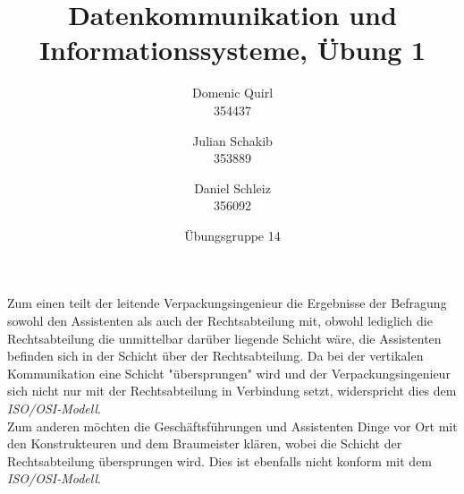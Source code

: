 \documentclass{../exercisesheet}
\title{Datenkommunikation und Informationssysteme, Übung 1}
\author{
    Domenic Quirl \\ 354437
    \and
    Julian Schakib \\ 353889
    \and 
    Daniel Schleiz \\ 356092
}
\date{Übungsgruppe 14}
\begin{document}
\maketitle
\pointtable

\begin{exercise}{1}
	Zum einen teilt der leitende Verpackungsingenieur die Ergebnisse der Befragung sowohl den Assistenten als auch der Rechtsabteilung mit, obwohl lediglich
	die Rechtsabteilung die unmittelbar darüber liegende Schicht wäre, die Assistenten befinden sich in der Schicht über der Rechtsabteilung. Da bei der vertikalen
	Kommunikation eine Schicht "übersprungen" wird und der Verpackungsingenieur sich nicht nur mit der Rechtsabteilung in Verbindung setzt, widerspricht dies
	dem \textit{ISO/OSI-Modell}. \\
	Zum anderen möchten die Geschäftsführungen und Assistenten Dinge vor Ort mit den Konstrukteuren und dem Braumeister klären, wobei die Schicht der	
	Rechtsabteilung übersprungen wird. Dies ist ebenfalls nicht konform mit dem \textit{ISO/OSI-Modell}. \\
\end{exercise}
\end{document}
